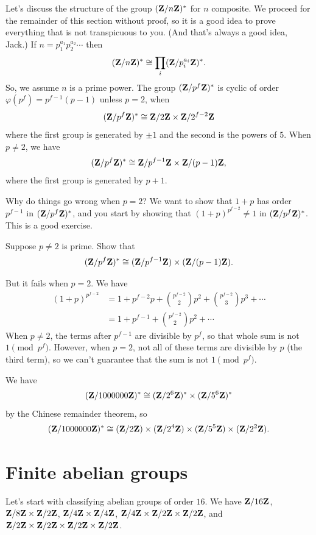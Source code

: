 \documentclass[11pt, oneside]{amsart}
\begin{document}
Let's discuss the structure of the group $(\mathbf Z / n\mathbf Z)^*$ for $n$ composite. We proceed for the remainder of this section without proof, so it is a good idea to prove everything that is not transpicuous to you. (And that's always a good idea, Jack.) If $n = p_1^{a_1} p_2^{a_2}\cdots $ then 
$$
(\mathbf Z / n\mathbf Z)^* \cong \prod_i (\mathbf Z/p_i^{a_i}\mathbf Z)^*.
$$
So, we assume $n$ is a prime power. The group $(\mathbf Z / p^f\mathbf Z)^*$ is cyclic of order $\varphi (p^f) = p^{f-1} (p-1)$ unless $p=2$, when 
$$
(\mathbf Z / p^f\mathbf Z)^* \cong \mathbf Z / 2\mathbf Z \times \mathbf Z / 2^{f-2}\mathbf Z
$$
where the first group is generated by $\pm 1$ and the second is the powers of $5$. When $p\ne 2$, we have 
$$
(\mathbf Z / p^f\mathbf Z)^* \cong \mathbf Z / p^{f-1}\mathbf Z \times \mathbf Z / (p-1)\mathbf Z,
$$
where the first group is generated by $p+1$.

Why do things go wrong when $p=2$? We want to show that $1+p$ has order $p^{f-1}$ in $(\mathbf Z / p^f\mathbf Z)^*$, and you start by showing that $(1+p)^{p^{f-2}}\ne 1$ in $(\mathbf Z / p^f\mathbf Z)^*$. This is a good exercise.

\begin{exercise}
Suppose $p\ne 2$ is prime. Show that 
$$
(\mathbf Z / p^f\mathbf Z)^* \cong (\mathbf Z / p^{f-1}\mathbf Z) \times (\mathbf Z / (p-1)\mathbf Z).
$$
\end{exercise}

But it fails when $p=2$. We have
\begin{align*}
(1+p)^{p^{f-2}} &= 1 + p^{f-2} p + \binom{p^{f-2}}{2} p^2 + \binom{p^{f-2}}{3} p^3 + \cdots\\
&= 1 + p^{f-1} + \binom{p^{f-2}}{2} p^2 + \cdots
\end{align*}
When $p\ne 2$, the terms after $p^{f-1}$ are divisible by $p^f$, so that whole sum is not $1\pmod {p^f}$. However, when $p=2$, not all of these terms are divisible by $p$ (the third term), so we can't guarantee that the sum is not $1\pmod {p^f}$.
\begin{example}
We have
$$
(\mathbf Z / 1000000\mathbf Z)^* \cong (\mathbf Z / 2^6\mathbf Z)^* \times (\mathbf Z/5^6\mathbf Z)^*
$$
by the Chinese remainder theorem, so
$$
(\mathbf Z / 1000000\mathbf Z)^* \cong (\mathbf Z / 2\mathbf Z) \times (\mathbf Z/2^4\mathbf Z) \times (\mathbf Z / 5^5\mathbf Z) \times (\mathbf Z / 2^2\mathbf Z).
$$
\end{example}

\section{Finite abelian groups}
Let's start with classifying abelian groups of order $16$. We have $\mathbf Z / 16\mathbf Z$, $\mathbf Z / 8\mathbf Z\times \mathbf Z / 2\mathbf Z$, $\mathbf Z / 4\mathbf Z \times \mathbf Z / 4\mathbf Z$, $\mathbf Z / 4\mathbf Z \times \mathbf Z / 2\mathbf Z\times\mathbf Z / 2\mathbf Z$, and $\mathbf Z / 2\mathbf Z \times \mathbf Z / 2\mathbf Z\times \mathbf Z / 2\mathbf Z\times \mathbf Z / 2\mathbf Z$. 
\end{document}

